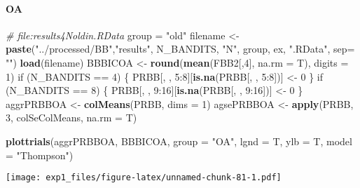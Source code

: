 \documentclass[11pt,,]{article}
\newenvironment{Shaded}{\begin{snugshade}}{\end{snugshade}}
\newcommand{\KeywordTok}[1]{\textcolor[rgb]{0.13,0.29,0.53}{\textbf{{#1}}}}
\newcommand{\DataTypeTok}[1]{\textcolor[rgb]{0.13,0.29,0.53}{{#1}}}
\newcommand{\DecValTok}[1]{\textcolor[rgb]{0.00,0.00,0.81}{{#1}}}
\newcommand{\StringTok}[1]{\textcolor[rgb]{0.31,0.60,0.02}{{#1}}}
\newcommand{\CommentTok}[1]{\textcolor[rgb]{0.56,0.35,0.01}{\textit{{#1}}}}
\newcommand{\NormalTok}[1]{{#1}}
\let\oldparagraph\paragraph
\renewcommand{\paragraph}[1]{\oldparagraph{#1}\mbox{}}
\begin{document}
\newpage

\paragraph{OA}\label{oa}

\begin{Shaded}
\begin{Highlighting}[]
\CommentTok{# file:results4Noldin.RData}
\NormalTok{group =}\StringTok{ "old"}
\NormalTok{filename  <-}\StringTok{ }\KeywordTok{paste}\NormalTok{(}\StringTok{"../processed/BB"}\NormalTok{,}\StringTok{"results"}\NormalTok{, N_BANDITS, }\StringTok{"N"}\NormalTok{, }
                   \NormalTok{group, ex, }\StringTok{".RData"}\NormalTok{, }\DataTypeTok{sep=} \StringTok{""}\NormalTok{)}
\KeywordTok{load}\NormalTok{(filename)}
\NormalTok{BBBICOA <-}\StringTok{ }\KeywordTok{round}\NormalTok{(}\KeywordTok{mean}\NormalTok{(FBB2[,}\DecValTok{4}\NormalTok{], }\DataTypeTok{na.rm =} \NormalTok{T), }\DataTypeTok{digits =} \DecValTok{1}\NormalTok{)}
\NormalTok{if (N_BANDITS ==}\StringTok{ }\DecValTok{4}\NormalTok{) \{}
    \NormalTok{PRBB[, , }\DecValTok{5}\NormalTok{:}\DecValTok{8}\NormalTok{][}\KeywordTok{is.na}\NormalTok{(PRBB[, , }\DecValTok{5}\NormalTok{:}\DecValTok{8}\NormalTok{])] <-}\StringTok{ }\DecValTok{0}
\NormalTok{\}}
\NormalTok{if (N_BANDITS ==}\StringTok{ }\DecValTok{8}\NormalTok{) \{}
    \NormalTok{PRBB[, , }\DecValTok{9}\NormalTok{:}\DecValTok{16}\NormalTok{][}\KeywordTok{is.na}\NormalTok{(PRBB[, , }\DecValTok{9}\NormalTok{:}\DecValTok{16}\NormalTok{])] <-}\StringTok{ }\DecValTok{0}
\NormalTok{\}}
\NormalTok{aggrPRBBOA  <-}\StringTok{ }\KeywordTok{colMeans}\NormalTok{(PRBB, }\DataTypeTok{dims =} \DecValTok{1}\NormalTok{) }
\NormalTok{agsePRBBOA <-}\StringTok{ }\KeywordTok{apply}\NormalTok{(PRBB, }\DecValTok{3}\NormalTok{, colSeColMeans, }\DataTypeTok{na.rm =} \NormalTok{T) }
\end{Highlighting}
\end{Shaded}

\begin{Shaded}
\begin{Highlighting}[]
\KeywordTok{plottrials}\NormalTok{(aggrPRBBOA, BBBICOA, }\DataTypeTok{group =} \StringTok{"OA"}\NormalTok{, }\DataTypeTok{lgnd =} \NormalTok{T, }\DataTypeTok{ylb =} \NormalTok{T, }\DataTypeTok{model =} \StringTok{"Thompson"}\NormalTok{)}
\end{Highlighting}
\end{Shaded}

\texttt{[image: exp1\_files/figure-latex/unnamed-chunk-81-1.pdf]}
\end{document}
